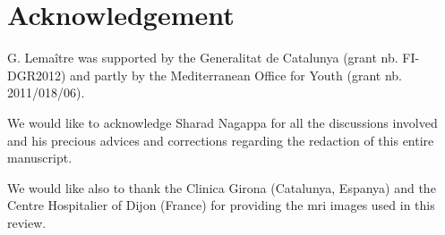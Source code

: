 \section{Acknowledgement} \label{sec:acknowledgement}

G. Lema\^itre was supported by the Generalitat de Catalunya (grant nb. FI-DGR2012) and partly by the Mediterranean Office for Youth (grant nb. 2011/018/06).

We would like to acknowledge Sharad Nagappa for all the discussions involved and his precious advices and corrections regarding the redaction of this entire manuscript.

We would like also to thank the Clinica Girona (Catalunya, Espanya) and the Centre Hospitalier of Dijon (France) for providing the \ac{mri} images used in this review.